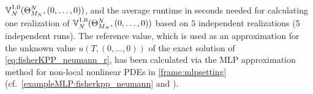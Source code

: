 $
{\mathbb{V}}^{1,0}_N(\Theta^N_{M_N},\allowbreak (0,\ldots,0))
$,
and the average runtime in seconds needed for calculating one realization of $
{\mathbb{V}}^{1,0}_N(\Theta^N_{M_N},\allowbreak (0,\ldots,0))
$
%
based on $5$ independent realizations (5 independent runs).
%
The reference value, which is used as an approximation for the unknown value $u(T,(0,\ldots,0))$ of the exact solution of \eqref{eq:fisherKPP_neumann_r}, has been calculated via the MLP approximation method for non-local nonlinear PDEs in \cref{frame:mlpsetting} (cf.~\cref{exampleMLP:fisherkpp_neumann} and \cite[Remark~3.3]{Beck2017a}).

